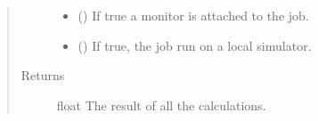 \documentclass[letterpaper,10pt,english]{sphinxmanual}
\begin{document}
\begin{fulllineitems}
\begin{quote}
\begin{description}
\begin{itemize}
\item {} 
 () \textendash{} If true a monitor is attached to the job.

\item {} 
 () \textendash{} If true, the job run on a local simulator.

\end{itemize}

\item[{Returns}] \leavevmode
float \textendash{} The result of all the calculations.

\end{description}\end{quote}

\end{fulllineitems}

\end{document}
